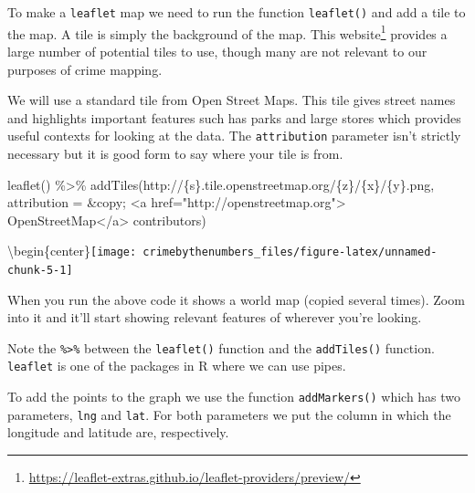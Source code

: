\documentclass[
]{krantz}
\makeatletter
\newenvironment{Shaded}{\begin{snugshade}}{\end{snugshade}}
\newcommand{\AttributeTok}[1]{\textcolor[rgb]{0.61,0.61,0.61}{#1}}
\newcommand{\FunctionTok}[1]{\textcolor[rgb]{0,0,0}{#1}}
\newcommand{\NormalTok}[1]{#1}
\newcommand{\SpecialCharTok}[1]{\textcolor[rgb]{0,0,0}{#1}}
\newcommand{\StringTok}[1]{\textcolor[rgb]{0.5,0.5,0.5}{#1}}
\renewcommand{\href}[2]{#2\footnote{\url{#1}}}
\newenvironment{kframe}{%
\medskip{}
\setlength{\fboxsep}{.8em}
 \def\at@end@of@kframe{}%
 \ifinner\ifhmode%
  \def\at@end@of@kframe{\end{minipage}}%
  \begin{minipage}{\columnwidth}%
 \fi\fi%
 \def\FrameCommand##1{\hskip\@totalleftmargin \hskip-\fboxsep
 \colorbox{shadecolor}{##1}\hskip-\fboxsep
     \hskip-\linewidth \hskip-\@totalleftmargin \hskip\columnwidth}%
 \MakeFramed {\advance\hsize-\width
   \@totalleftmargin\z@ \linewidth\hsize
   \@setminipage}}%
 {\par\unskip\endMakeFramed%
 \at@end@of@kframe}
\renewenvironment{Shaded}{\begin{kframe}}{\end{kframe}}
\makeatother
\begin{document}
To make a \texttt{leaflet} map we need to run the function \texttt{leaflet()} and add a tile to the map. A tile is simply the background of the map. This \href{https://leaflet-extras.github.io/leaflet-providers/preview/}{website} provides a large number of potential tiles to use, though many are not relevant to our purposes of crime mapping.

We will use a standard tile from Open Street Maps. This tile gives street names and highlights important features such has parks and large stores which provides useful contexts for looking at the data. The \texttt{attribution} parameter isn't strictly necessary but it is good form to say where your tile is from.

\begin{Shaded}
\begin{Highlighting}[]
\FunctionTok{leaflet}\NormalTok{() }\SpecialCharTok{\%\textgreater{}\%} 
  \FunctionTok{addTiles}\NormalTok{(}\StringTok{\textquotesingle{}http://\{s\}.tile.openstreetmap.org/\{z\}/\{x\}/\{y\}.png\textquotesingle{}}\NormalTok{, }
           \AttributeTok{attribution =} \StringTok{\textquotesingle{}\&copy; \textless{}a href="http://openstreetmap.org"\textgreater{}}
\StringTok{                OpenStreetMap\textless{}/a\textgreater{} contributors\textquotesingle{}}\NormalTok{)}
\end{Highlighting}
\end{Shaded}

\textbackslash begin\{center\}\texttt{[image: crimebythenumbers\_files/figure-latex/unnamed-chunk-5-1]}

When you run the above code it shows a world map (copied several times). Zoom into it and it'll start showing relevant features of wherever you're looking.

Note the \texttt{\%\textgreater{}\%} between the \texttt{leaflet()} function and the \texttt{addTiles()} function. \texttt{leaflet} is one of the packages in R where we can use pipes.

To add the points to the graph we use the function \texttt{addMarkers()} which has two parameters, \texttt{lng} and \texttt{lat}. For both parameters we put the column in which the longitude and latitude are, respectively.

\begin{Shaded}
\end{Shaded}
\end{document}

